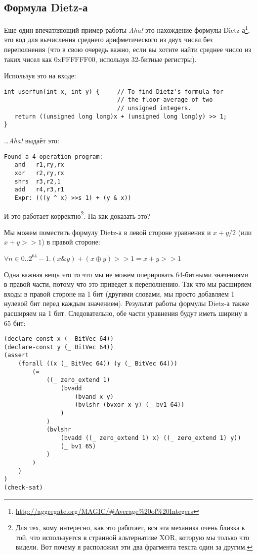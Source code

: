 \subsection{Формула Dietz-а}

Еще один впечатляющий пример работы \textit{Aha!} это нахождение формулы Dietz-а\footnote{\url{http://aggregate.org/MAGIC/\#Average\%20of\%20Integers}},
это код для вычисления среднего арифметического из двух чисел без переполнения
(что в свою очередь важно, если вы хотите найти среднее число из таких чисел как 0xFFFFFF00, используя 32-битные регистры).

Используя это на входе:

\begin{lstlisting}
int userfun(int x, int y) {     // To find Dietz's formula for
                                // the floor-average of two
                                // unsigned integers.
   return ((unsigned long long)x + (unsigned long long)y) >> 1;
}
\end{lstlisting}

\dots \textit{Aha!} выдаёт это:

\begin{lstlisting}
Found a 4-operation program:
   and   r1,ry,rx
   xor   r2,ry,rx
   shrs  r3,r2,1
   add   r4,r3,r1
   Expr: (((y ^ x) >>s 1) + (y & x))
\end{lstlisting}

И это работает корректно\footnote{Для тех, кому интересно, как это работает, вся эта механика
очень близка к той, что используется в странной альтернативе XOR, которую мы только что видели.
Вот почему я расположил эти два фрагмента текста один за другим.}.
На как доказать это?

Мы можем поместить формулу Dietz-а в левой стороне уравнения и $x+y/2$ (или $x+y>>1$) в правой стороне:

\begin{center}
$\forall n \in 0..2^{64}-1 . (x\&y) + (x \oplus y)>>1 = x+y>>1$
\end{center}

Одна важная вещь это то что мы не можем оперировать 64-битными значениями в правой части, потому что это приведет
к переполнению.
Так что мы расширяем входы в правой стороне на 1 бит (другими словами, мы просто добавляем 1 нулевой бит перед каждым
значением).
Результат работы формулы Dietz-а также расширяем на 1 бит.
Следовательно, обе части уравнения будут иметь ширину в 65 бит:

\begin{lstlisting}
(declare-const x (_ BitVec 64))
(declare-const y (_ BitVec 64))
(assert 
	(forall ((x (_ BitVec 64)) (y (_ BitVec 64)))
		(=
			((_ zero_extend 1)
				(bvadd
					(bvand x y)
					(bvlshr (bvxor x y) (_ bv1 64))
				)
			)
			(bvlshr
				(bvadd ((_ zero_extend 1) x) ((_ zero_extend 1) y))
				(_ bv1 65)
			)
		)
	)
)
(check-sat)
\end{lstlisting}

